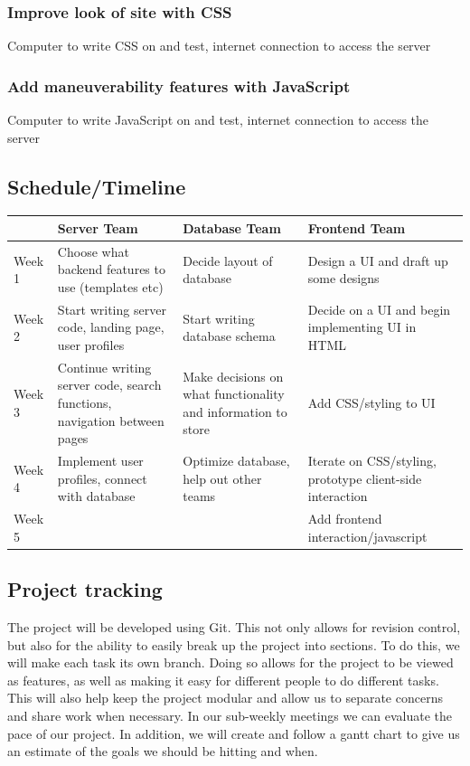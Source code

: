 \documentclass[12pt]{article}
\begin{document}
\subsubsection{Improve look of site with CSS}
Computer to write CSS on and test, internet connection to access the server
\subsubsection{Add maneuverability features with JavaScript}
Computer to write JavaScript on and test, internet connection to access the server
\subsection{Schedule/Timeline}
\begin{tabular}{|p{1in}|p{1in}|p{1in}|p{1in}|} \hline
	& Server Team & Database Team & Frontend Team \\ \hline
	Week 1 & Choose what backend features to use (templates etc) & Decide layout of
	database & Design a UI and draft up some designs \\ \hline
	Week 2 & Start writing server code, landing page, user profiles & Start writing
	database schema & Decide on a UI and begin implementing UI in HTML \\ \hline
	Week 3 & Continue writing server code, search functions, navigation between pages
	& Make decisions on what functionality and information to store & Add CSS/styling
	to UI \\ \hline
	Week 4 & Implement user profiles, connect with database & Optimize database, help
	out other teams & Iterate on CSS/styling, prototype client-side interaction \\
	\hline
	Week 5 & & & Add frontend interaction/javascript \\ \hline
\end{tabular}
\subsection{Project tracking}
The project will be developed using Git. This not only allows for revision control, but
also for the ability to easily break up the project into sections. To do this, we will
make each task its own branch. Doing so allows for the project to be viewed as features,
as well as making it easy for different people to do different tasks. This will also help
keep the project modular and allow us to separate concerns and share work when necessary.
In our sub-weekly meetings we can evaluate the pace of our project. In addition, we will
create and follow a gantt chart to give us an estimate of the goals we should be hitting
and when.
\end{document}
